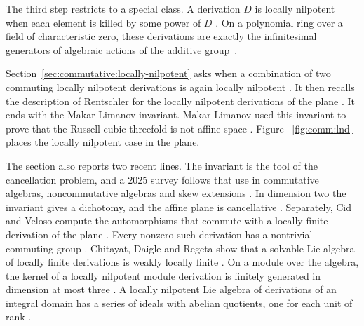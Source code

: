 The third step restricts to a special class. A derivation $D$ is locally
nilpotent when each element is killed by some power of $D$
\cite[p.~354]{DaigleFreudenburg1998UFD}. On a polynomial ring over a field of
characteristic zero, these derivations are exactly the infinitesimal
generators of algebraic actions of the additive
group~\cite[p.~354]{DaigleFreudenburg1998UFD}.

Section~\ref{sec:commutative:locally-nilpotent} asks when a combination of two
commuting locally nilpotent derivations is again locally nilpotent
\cite[Theorem, p.~47]{FerreroLequainNowicki1992}. It then recalls the
description of Rentschler for the locally nilpotent derivations of the plane
\cite[pp.~356--357]{DaigleFreudenburg1998UFD}. It ends with the Makar-Limanov
invariant. Makar-Limanov used this invariant to prove that the Russell cubic
threefold is not affine space \cite[p.~66]{VanEssenKurodaKoenig2021}. Figure
~\ref{fig:comm:lnd} places the locally nilpotent case in the plane.


The section also reports two recent lines. The invariant is the tool of the
cancellation problem, and a 2025 survey follows that use in commutative
algebras, noncommutative algebras and skew extensions
\cite[pp.~1--3]{VenegasVenegas2025Cancellation}. In dimension two the
invariant gives a dichotomy, and the affine plane is cancellative
\cite[Theorems~2.2--2.3, p.~7]{VenegasVenegas2025Cancellation}. Separately,
Cid and Veloso compute the automorphisms that commute with a locally finite
derivation of the plane \cite[p.~1]{CidVeloso2026Isotropy}. Every nonzero
such derivation has a nontrivial commuting group
\cite[Proposition~3.1, p.~3]{CidVeloso2026Isotropy}. Chitayat, Daigle and
Regeta show that a solvable Lie algebra of locally finite derivations is
weakly locally finite \cite[Corollary~4, p.~2]{ChitayatDaigleRegeta2026}.
On a module over the algebra, the kernel of a locally nilpotent module
derivation is finitely generated in dimension at most three
\cite[Corollary~4.7, p.~10]{Tanaka2010ModuleDerivations}. A locally
nilpotent Lie algebra of derivations of an integral domain has a series of
ideals with abelian quotients, one for each unit of rank
\cite[Theorem~1, p.~5]{PetravchukShevchykSysak2017}.

